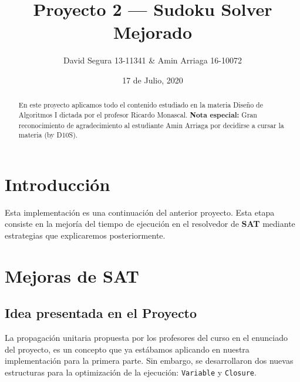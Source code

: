 \documentclass[letterpaper,12pt]{article}
\begin{document}
\title{Proyecto 2 --- Sudoku Solver Mejorado}
\author{David Segura 13-11341 \& Amin Arriaga 16-10072}
\date{17 de Julio, 2020}
\maketitle

\begin{abstract}
En este proyecto aplicamos todo el contenido estudiado en la materia Diseño de Algoritmos I dictada por el profesor Ricardo Monascal. \textbf{Nota especial:} Gran reconocimiento de agradecimiento al estudiante Amin Arriaga por decidirse a cursar la materia (by D10S).
\end{abstract}


\section{Introducción}

Esta implementación es una continuación del anterior proyecto. Esta etapa consiste en la mejoría del tiempo de ejecución en el resolvedor de \textbf{SAT} mediante estrategias que explicaremos posteriormente.

\section{Mejoras de SAT}

\subsection{Idea presentada en el Proyecto}

La propagación unitaria propuesta por los profesores del curso en el enunciado del proyecto, es un concepto que ya estábamos aplicando en nuestra implementación para la primera parte. Sin embargo, se desarrollaron dos nuevas estructuras para la optimización de la ejecución: \texttt{Variable} y \texttt{Closure}.
\end{document}
